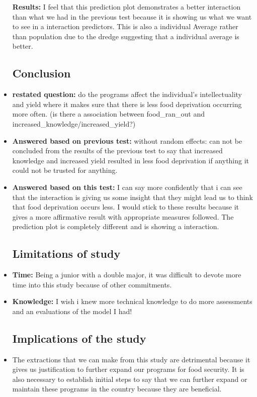 \documentclass[
  letterpaper,
  DIV=11,
  numbers=noendperiod]{scrartcl}
\begin{document}
\begin{itemize}
\begin{figure}[H]
{  }

  \end{figure}

  \textbf{Results:} I feel that this prediction plot demonstrates a
  better interaction than what we had in the previous test because it is
  showing us what we want to see in a interaction predictors. This is
  also a individual Average rather than population due to the dredge
  suggesting that a individual average is better.

  \hypertarget{conclusion}{%
  \subsection{Conclusion}\label{conclusion}}
\item
  \textbf{restated question:} do the programs affect the individual's
  intellectuality and yield where it makes sure that there is less food
  deprivation occurring more often. (is there a association between
  food\_ran\_out and increased\_knowledge/increased\_yield?)
\item
  \textbf{Answered based on previous test:} without random effects: can
  not be concluded from the results of the previous test to say that
  increased knowledge and increased yield resulted in less food
  deprivation if anything it could not be trusted for anything.
\item
  \textbf{Answered based on this test:} I can say more confidently that
  i can see that the interaction is giving us some insight that they
  might lead us to think that food deprivation occurs less. I would
  stick to these results because it gives a more affirmative result with
  appropriate measures followed. The prediction plot is completely
  different and is showing a interaction.

  \hypertarget{limitations-of-study}{%
  \subsection{Limitations of study}\label{limitations-of-study}}
\item
  \textbf{Time:} Being a junior with a double major, it was difficult to
  devote more time into this study because of other commitments.
\item
  \textbf{Knowledge:} I wish i knew more technical knowledge to do more
  assessments and an evaluations of the model I had!

  \hypertarget{implications-of-the-study}{%
  \subsection{Implications of the
  study}\label{implications-of-the-study}}
\item
  The extractions that we can make from this study are detrimental
  because it gives us justification to further expand our programs for
  food security. It is also necessary to establish initial steps to say
  that we can further expand or maintain these programs in the country
  because they are beneficial.


\end{itemize}
\end{document}
